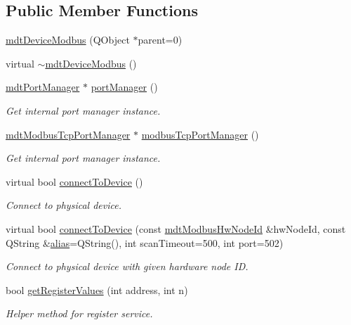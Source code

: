 \subsection*{Public Member Functions}
\begin{DoxyCompactItemize}
\item 
\hyperlink{classmdt_device_modbus_ac69cfbe26681342ba05672ab63de2a1f}{mdt\-Device\-Modbus} (Q\-Object $\ast$parent=0)
\item 
virtual \hyperlink{classmdt_device_modbus_a4696f2e3855917a3e3c02a822f9664e2}{$\sim$mdt\-Device\-Modbus} ()
\item 
\hyperlink{classmdt_port_manager}{mdt\-Port\-Manager} $\ast$ \hyperlink{classmdt_device_modbus_aed892b501f8cbd372ccfda1a4fafa536}{port\-Manager} ()
\begin{DoxyCompactList}\small\item\em Get internal port manager instance. \end{DoxyCompactList}\item 
\hyperlink{classmdt_modbus_tcp_port_manager}{mdt\-Modbus\-Tcp\-Port\-Manager} $\ast$ \hyperlink{classmdt_device_modbus_ac547788aa95d46c00ddb1342eb46ef93}{modbus\-Tcp\-Port\-Manager} ()
\begin{DoxyCompactList}\small\item\em Get internal port manager instance. \end{DoxyCompactList}\item 
virtual bool \hyperlink{classmdt_device_modbus_ae8634515742f3ed42dc52dfaa8d65313}{connect\-To\-Device} ()
\begin{DoxyCompactList}\small\item\em Connect to physical device. \end{DoxyCompactList}\item 
virtual bool \hyperlink{classmdt_device_modbus_ad6996c61045f2b0247cf19359e3d269d}{connect\-To\-Device} (const \hyperlink{classmdt_modbus_hw_node_id}{mdt\-Modbus\-Hw\-Node\-Id} \&hw\-Node\-Id, const Q\-String \&\hyperlink{classmdt_device_a3aa589ecae0fa3deed61431d07db9276}{alias}=Q\-String(), int scan\-Timeout=500, int port=502)
\begin{DoxyCompactList}\small\item\em Connect to physical device with given hardware node I\-D. \end{DoxyCompactList}\item 
bool \hyperlink{classmdt_device_modbus_a89d41c6b33a3dd2a92a0956d8e6b3b14}{get\-Register\-Values} (int address, int n)
\begin{DoxyCompactList}\small\item\em Helper method for register service. \end{DoxyCompactList}\item 

\end{DoxyCompactItemize}
